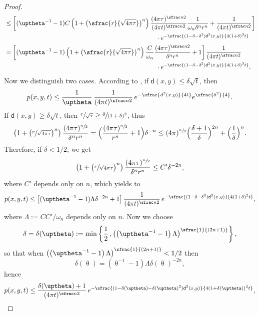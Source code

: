 \documentclass[JEP,XML,SOM,Unicode,published]{cedram}
\newcommand{\spfrac}[2]{\sfrac{#1}{(#2)}}
\theoremstyle{plain}
\theoremstyle{definition}
\newcommand{\dist}{\mathsf{d}}
\begin{document}
\begin{proof}
\begin{align*}
& \le\left[(\uptheta^{-1}-1) C\left(1+\bigl(\sfrac{r}{\sqrt{4\pi\tau}} \bigr)^n\right)\frac{(4\pi \tau)^{\sfrac n2}}{(4\pi t)^{\sfrac n2}}\frac{1}{\omega_n \delta^n r^n}+\frac{1}{(4\pi t)^{\sfrac n2}}\right]\\
&\hspace*{8.5cm}\cdot e^{-\sfrac{(1-\delta-\delta^2)\dist^2(x,y)}{4(1+\delta)^3t}}\\
& = \left[(\uptheta^{-1}-1)\left(1+\bigl(\sfrac{r}{\sqrt{4\pi\tau}} \bigr)^n\right) \frac{C}{\omega_n}\frac{(4\pi \tau)^{\sfrac n2}}{\delta^n r^n} +1\right]\frac{1}{(4\pi t)^{\sfrac n2}}\\
&\hspace*{8.5cm}\cdot e^{-\sfrac{(1-\delta-\delta^2)\dist^2(x,y)}{4(1+\delta)^3t}}.
\end{align*}
Now we distinguish two cases. According to \cite[Form.\,(2.4)]{LiTamWang}, if $\dist(x,y)\le \delta \sqrt{t}$, then
\begin{equation}\label{esti1}p(x,y,t)\le \frac{1}{\uptheta}\, \frac{1}{(4\pi t)^{\sfrac n2}}\, e^{-\sfrac{d^2(x,y)}{4t}} e^{\sfrac{\delta^2}{4}}.\end{equation}
If $\dist(x,y)\ge \delta \sqrt{t}$, then $\sfrac{r}{\sqrt{\tau}}\ge \sfrac{\delta}{(1+\delta)^{2}}$, thus
\[
\left(1+\bigl(\sfrac{r}{\sqrt{4\pi\tau}}\bigr)^n\right) \frac{(4\pi \tau)^{\sfrac n2}}{\delta^n r^n} = \Bigl(\frac{(4\pi \tau)^{\sfrac n2}}{r^n} + 1 \Bigr)\delta^{-n} \le (4\pi)^{\sfrac n2}\Bigl(\frac{\delta+ 1}{\delta}\Bigr)^{2n}+\Bigl(\frac{1}{\delta}\Bigr)^n.
\]
Therefore, if $\delta<1/2$, we get
\[
\left(1+\bigl(\sfrac{r}{\sqrt{4\pi\tau}}\bigr)^n\right) \frac{(4\pi \tau)^{\sfrac n2}}{\delta^n r^n} \le C'\delta^{-2n},
\]
where $C'$ depends only on $n$, which yields to
\[
p(x,y,t) \le \left[(\uptheta^{-1}-1)\Lambda \delta^{-2n}+1\right]\frac{1}{(4\pi t)^{\sfrac n2}}\,e^{-\sfrac{(1-\delta-\delta^2)\dist^2(x,y)}{4(1+\delta)^3t}},
\]
where $\Lambda:=CC'/\omega_n$ depends only on $n$. Now we choose \begin{equation}\label{eq:delta}
\delta=\delta(\uptheta):=\min\left\{ \frac 12\,, \left(\left(\uptheta^{-1}-1\right)\Lambda\right)^{\spfrac{1}{2n+1}}\right\},\end{equation}
so that when $\left(\left(\uptheta^{-1}-1\right)\Lambda\right)^{\spfrac{1}{2n+1}} < 1/2$ then
\[
\delta(\uptheta)= \left(\uptheta^{-1}-1\right)\Lambda\delta(\uptheta)^{-2n},
\]
hence
\begin{equation}\label{eq:end}
p(x,y,t)\le \frac{\delta(\uptheta)+1}{(4\pi t)^{\sfrac n2}}\,e^{-\sfrac{(1-\delta(\uptheta)-\delta(\uptheta)^2)\dist^2(x,y)}{4(1+\delta(\uptheta))^3t}},

\end{equation}
\end{proof}
\end{document}
